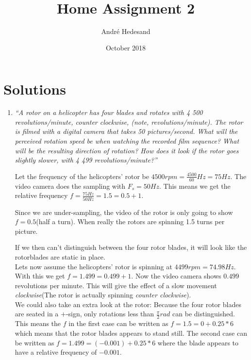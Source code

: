 \documentclass{article}
\title{Home Assignment 2}
\author{André Hedesand}
\date{October 2018}
\begin{document}
\maketitle
\thispagestyle{fancy}
\section*{Solutions}
\begin{enumerate}
    \item %
        \emph{``A rotor on a helicopter has four blades and rotates with 4 500 revolutions/minute, counter
            clockwise, (note, revolutions/minute). The rotor is filmed with a digital camera that takes 50
            pictures/second. What will the perceived rotation speed be when watching the recorded film sequence?
            What will be the resulting direction of rotation? How does it look if the rotor goes slightly 
            slower, with 4 499 revolutions/minute?''} 

        Let the frequency of the helicopters' rotor be $4500rpm = \frac{4500}{60}Hz = 75Hz$. 
        The video camera does the sampling with $F_s=50Hz$. This means we get the relative 
        frequency $f=\frac{75Hz}{50Hz}=1.5=0.5+1$.

        Since we are under-sampling, the video of the rotor is only going to show $f=0.5$(half 
        a turn). When really the rotors are spinning 1.5 turns per picture. 

        If we then can't distinguish between the four rotor blades, it will look like the     
        rotorblades are static in place.
        \\

        Lets now assume the helicopters' rotor is spinning at $4499rpm=74.98Hz$. With 
        this we get $f=1.499=0.499+1$. Now the video camera shows $0.499$ revolutions per     
        minute. This will give the effect of a slow movement \emph{clockwise}(The rotor is 
        actually spinning \emph{counter clockwise}).
        \\

        We could also take an extra look at the rotor: Because the four rotor blades are seated in a $+$-sign,
        only rotations less than $\frac{\pi}{2}rad$ can be distinguished. This means the $f$ in the first case 
        can be written as $f = 1.5 = 0 + 0.25 * 6$ which means that the rotor blades appears to stand still. The
        second case can be written as $f = 1.499 = (-0.001) + 0.25 * 6$ where the blade appears to have a
        relative frequency of $-0.001$.



\end{enumerate}
\end{document}
